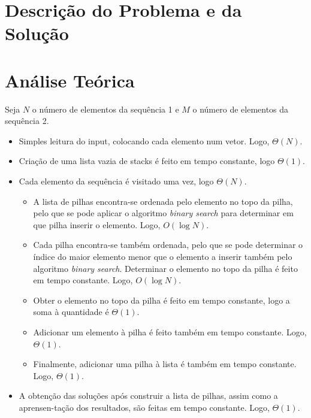 \documentclass[12pt,a4paper]{article}
\begin{document}
  \section{Descrição do Problema e da Solução}


  \section{Análise Teórica}


  Seja $N$ o número de elementos da sequência 1 e $M$ o número de elementos da sequência 2.

  \begin{itemize}
    \setlength{\itemsep}{0pt}
    \item Simples leitura do input, colocando cada elemento num vetor. Logo, $\Theta(N)$.
    \item Criação de uma lista vazia de stacks é feito em tempo constante, logo $\Theta(1)$.
    \item Cada elemento da sequência é visitado uma vez, logo $\Theta(N)$.
    \begin{itemize}
      \setlength{\itemsep}{0pt}
      \item A lista de pilhas encontra-se ordenada pelo elemento no topo da pilha, pelo que se pode aplicar o algoritmo \textit{binary search} para determinar em que pilha inserir o elemento. Logo, $O(\log N)$.
      \item Cada pilha encontra-se também ordenada, pelo que se pode determinar o índice do maior elemento menor que o elemento a inserir também pelo algoritmo \textit{binary search}. Determinar o elemento no topo da pilha é feito em tempo constante. Logo, $O(\log N)$.
      \item Obter o elemento no topo da pilha é feito em tempo constante, logo a soma à quantidade é $\Theta(1)$.
      \item Adicionar um elemento à pilha é feito também em tempo constante. Logo, $\Theta(1)$.
      \item Finalmente, adicionar uma pilha à lista é também em tempo constante. Logo, $\Theta(1)$.
    \end{itemize}
    \item A obtenção das soluções após construir a lista de pilhas, assim como a aprensen-tação dos resultados, são feitas em tempo constante. Logo, $\Theta(1)$.
  \end{itemize}
\end{document}
